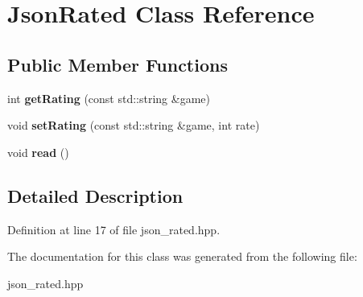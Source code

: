 \hypertarget{class_json_rated}{\section{Json\-Rated Class Reference}
\label{class_json_rated}
}
\subsection*{Public Member Functions}
\begin{DoxyCompactItemize}
\item 
\hypertarget{class_json_rated_acf15844e0a46d7a2ad16edd1d0ad9d3c}{int {\bfseries get\-Rating} (const std\-::string \&game)}\label{class_json_rated_acf15844e0a46d7a2ad16edd1d0ad9d3c}

\item 
\hypertarget{class_json_rated_a5802c607bf342bde984d3a1d2f8011c1}{void {\bfseries set\-Rating} (const std\-::string \&game, int rate)}\label{class_json_rated_a5802c607bf342bde984d3a1d2f8011c1}

\item 
\hypertarget{class_json_rated_a8019dffa3e9c7d6e6e1338f821aa2b92}{void {\bfseries read} ()}\label{class_json_rated_a8019dffa3e9c7d6e6e1338f821aa2b92}

\end{DoxyCompactItemize}


\subsection{Detailed Description}


Definition at line 17 of file json\-\_\-rated.\-hpp.



The documentation for this class was generated from the following file\-:\begin{DoxyCompactItemize}
\item 
json\-\_\-rated.\-hpp\end{DoxyCompactItemize}
